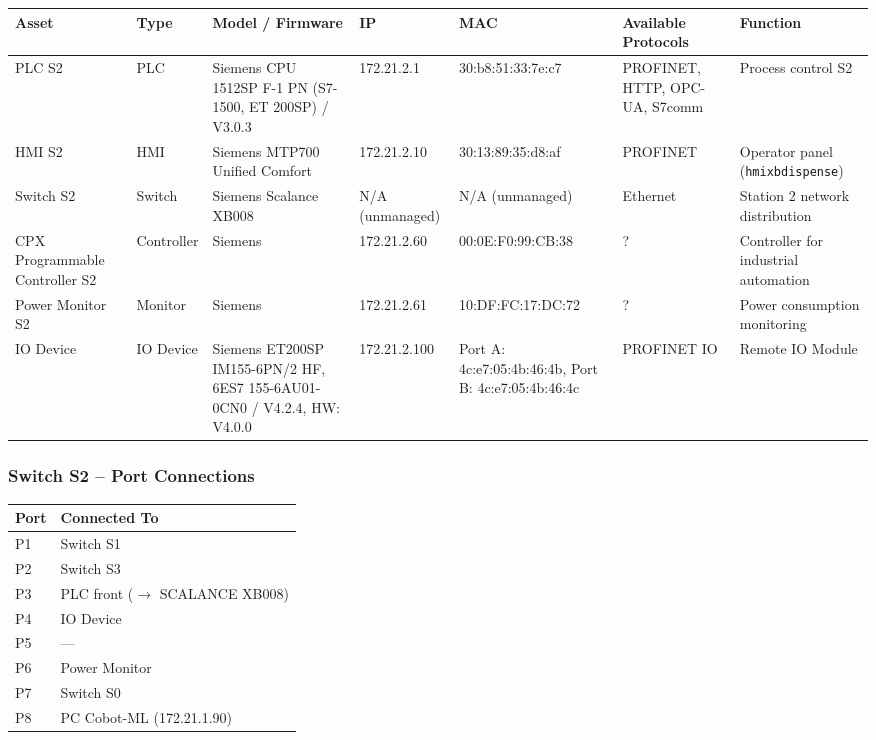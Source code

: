 \begin{adjustbox}{max width=\textwidth}
\begin{tabular}{lllllll}
\toprule
\textbf{Asset} & \textbf{Type} & \textbf{Model / Firmware} & \textbf{IP} & \textbf{MAC} & \textbf{Available Protocols} & \textbf{Function} \\
\midrule
PLC S2 & PLC & Siemens CPU 1512SP F-1 PN (S7-1500, ET 200SP) / V3.0.3 & 172.21.2.1 & 30:b8:51:33:7e:c7 & PROFINET, HTTP, OPC-UA, S7comm & Process control S2 \\
HMI S2 & HMI & Siemens MTP700 Unified Comfort & 172.21.2.10 & 30:13:89:35:d8:af & PROFINET & Operator panel (\texttt{hmixbdispense}) \\
Switch S2 & Switch & Siemens Scalance XB008 & N/A (unmanaged) & N/A (unmanaged) & Ethernet & Station 2 network distribution \\
CPX Programmable Controller S2 & Controller & Siemens & 172.21.2.60 & 00:0E:F0:99:CB:38 & ? & Controller for industrial automation \\
Power Monitor S2 & Monitor & Siemens & 172.21.2.61 & 10:DF:FC:17:DC:72 & ? & Power consumption monitoring \\
IO Device & IO Device & Siemens ET200SP IM155-6PN/2 HF, 6ES7 155-6AU01-0CN0 / V4.2.4, HW: V4.0.0 & 172.21.2.100 & Port A: 4c:e7:05:4b:46:4b, Port B: 4c:e7:05:4b:46:4c & PROFINET IO & Remote IO Module \\
\bottomrule
\end{tabular}
\end{adjustbox}

\subsubsection{Switch S2 – Port Connections}

\begin{tabular}{ll}
\toprule
\textbf{Port} & \textbf{Connected To} \\
\midrule
P1 & Switch S1 \\
P2 & Switch S3 \\
P3 & PLC front ($\rightarrow$ SCALANCE XB008) \\
P4 & IO Device \\
P5 & — \\
P6 & Power Monitor \\
P7 & Switch S0 \\
P8 & PC Cobot-ML (172.21.1.90) \\
\bottomrule
\end{tabular}

